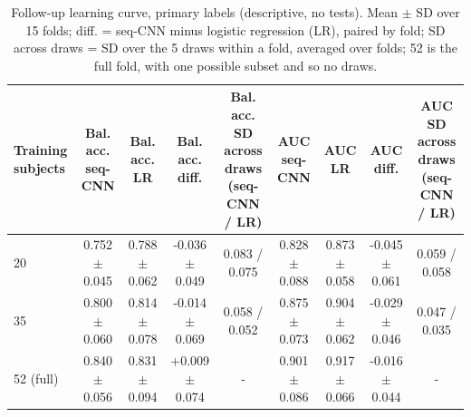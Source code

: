 \begin{table}[!t]
\centering
\footnotesize
\caption{Follow-up learning curve, primary labels (descriptive, no tests). Mean $\pm$ SD over 15 folds; diff. = seq-CNN minus logistic regression (LR), paired by fold; SD across draws = SD over the 5 draws within a fold, averaged over folds; 52 is the full fold, with one possible subset and so no draws.}
\label{tab:table7_followup_curve}
\begin{tabular}{lcccccccc}
\toprule
Training subjects & Bal. acc. seq-CNN & Bal. acc. LR & Bal. acc. diff. & Bal. acc. SD across draws (seq-CNN / LR) & AUC seq-CNN & AUC LR & AUC diff. & AUC SD across draws (seq-CNN / LR) \\
\midrule
20 & 0.752 $\pm$ 0.045 & 0.788 $\pm$ 0.062 & -0.036 $\pm$ 0.049 & 0.083 / 0.075 & 0.828 $\pm$ 0.088 & 0.873 $\pm$ 0.058 & -0.045 $\pm$ 0.061 & 0.059 / 0.058 \\
35 & 0.800 $\pm$ 0.060 & 0.814 $\pm$ 0.078 & -0.014 $\pm$ 0.069 & 0.058 / 0.052 & 0.875 $\pm$ 0.073 & 0.904 $\pm$ 0.062 & -0.029 $\pm$ 0.046 & 0.047 / 0.035 \\
52 (full) & 0.840 $\pm$ 0.056 & 0.831 $\pm$ 0.094 & +0.009 $\pm$ 0.074 & - & 0.901 $\pm$ 0.086 & 0.917 $\pm$ 0.066 & -0.016 $\pm$ 0.044 & - \\
\bottomrule
\end{tabular}
\end{table}
